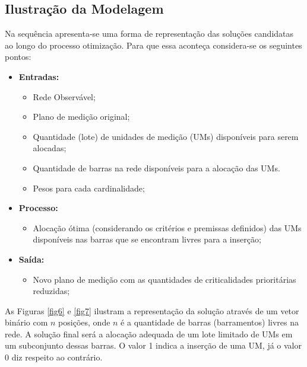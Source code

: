 \documentclass[12pt]{article}
\begin{document}
\subsection{Ilustração da Modelagem}

Na sequência apresenta-se uma forma de representação das soluções candidatas ao longo do processo otimização. Para que essa aconteça considera-se os seguintes pontos:

 \begin{itemize}
 	\item \textbf{Entradas:}
 	\begin{itemize}
 	\item Rede Observável;
 	\item Plano de medição original;
 	\item Quantidade (lote) de unidades de medição (UMs) disponíveis para serem alocadas;
 	\item Quantidade de barras na rede disponíveis para a alocação das UMs.
 	\item Pesos para cada cardinalidade;
 	\end{itemize}
 \end{itemize}

 \begin{itemize}
	\item \textbf{Processo:}
	\begin{itemize}
		\item Alocação ótima (considerando os critérios e premissas definidos) das UMs disponíveis nas barras que se encontram livres para a inserção;
	\end{itemize}
\end{itemize}


\begin{itemize}
	\item \textbf{Saída:}
	\begin{itemize}
		\item Novo plano de medição com as quantidades de criticalidades prioritárias reduzidas;
	\end{itemize}
\end{itemize}

As Figuras \ref{fig6} e \ref{fig7} ilustram a representação da solução através de um vetor binário com $n$ posições, onde $n$ é a quantidade de barras (barramentos) livres na rede. A solução final será a alocação adequada de um lote limitado de UMs em um subconjunto dessas barras. O valor 1 indica a inserção de uma UM, já o valor 0 diz respeito ao contrário.
\end{document}

